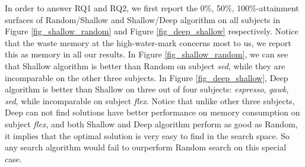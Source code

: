 \begin{figure*}[htbp]
	\centering
	\caption{0\%, 50\%, 100\%-attainment surfaces of Random and Shallow for each application.}\label{fig_shallow_random}
\end{figure*}

\begin{figure*}[htbp]
	\centering
	\caption{0\%, 50\%, 100\%-attainment surfaces of Deep and Shallow for each application.}\label{fig_deep_shallow}
\end{figure*}

In order to answer RQ1 and RQ2, we first report the 0\%, 50\%, 100\%-attainment surfaces of Random/Shallow and Shallow/Deep algorithm on all subjects in Figure \ref{fig_shallow_random} and Figure \ref{fig_deep_shallow} respectively. Notice that the waste memory at the high-water-mark concerns most to us, we report this as memory in all our results. In Figure \ref{fig_shallow_random}, we can see that Shallow algorithm is better than Random on subject \emph{sed}, while they are incomparable on the other three subjects. In Figure \ref{fig_deep_shallow}, Deep algorithm is better than Shallow on three out of four subjects: \emph{espresso}, \emph{gawk}, \emph{sed}, while incomparable on subject \emph{flex}. Notice that unlike other three subjects, Deep can not find solutions have better performance on memory consumption on subject \emph{flex}, and both Shallow and Deep algorithm perform as good as Random, it implies that the optimal solution is very easy to find in the search space. So any search algorithm would fail to ourperform Random search on this special case.

